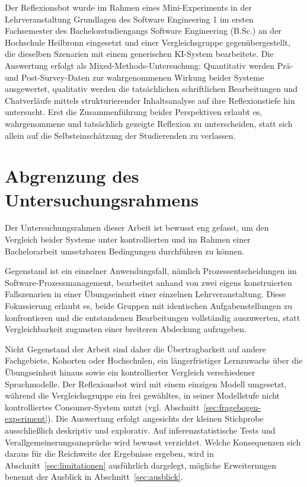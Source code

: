 Der Reflexionsbot wurde im Rahmen eines Mini-Experiments in der Lehrveranstaltung \glqq Grundlagen
des Software Engineering 1\grqq{} im ersten Fachsemester des Bachelorstudiengangs Software
Engineering (B.Sc.) an der Hochschule Heilbronn eingesetzt und einer Vergleichsgruppe
gegenübergestellt, die dieselben Szenarien mit einem generischen KI-System bearbeitete. Die Auswertung erfolgt als
Mixed-Methods-Untersuchung: Quantitativ werden Prä- und Post-Survey-Daten zur wahrgenommenen Wirkung
beider Systeme ausgewertet, qualitativ werden die tatsächlichen schriftlichen Bearbeitungen und
Chatverläufe mittels strukturierender Inhaltsanalyse auf ihre Reflexionstiefe hin untersucht. Erst
die Zusammenführung beider Perspektiven erlaubt es, wahrgenommene und tatsächlich gezeigte Reflexion
zu unterscheiden, statt sich allein auf die Selbsteinschätzung der Studierenden zu verlassen.

\section{Abgrenzung des Untersuchungsrahmens}
\label{sec:abgrenzung}

Der Untersuchungsrahmen dieser Arbeit ist bewusst eng gefasst, um den Vergleich beider Systeme unter
kontrollierten und im Rahmen einer Bachelorarbeit umsetzbaren Bedingungen durchführen zu können.

Gegenstand ist ein einzelner Anwendungsfall, nämlich Prozessentscheidungen im
Software-Prozessmanagement, bearbeitet anhand von zwei eigens konstruierten Fallszenarien in einer
Übungseinheit einer einzelnen Lehrveranstaltung. Diese Fokussierung erlaubt es, beide Gruppen mit identischen Aufgabenstellungen zu
konfrontieren und die entstandenen Bearbeitungen vollständig auszuwerten, statt Vergleichbarkeit
zugunsten einer breiteren Abdeckung aufzugeben.

Nicht Gegenstand der Arbeit sind daher die Übertragbarkeit auf andere Fachgebiete, Kohorten oder
Hochschulen, ein längerfristiger Lernzuwachs über die Übungseinheit hinaus sowie ein kontrollierter
Vergleich verschiedener Sprachmodelle. Der Reflexionsbot wird mit einem einzigen Modell umgesetzt,
während die Vergleichsgruppe ein frei gewähltes, in seiner Modellstufe nicht kontrolliertes
Consumer-System nutzt (vgl. Abschnitt~\ref{sec:fragebogen-experiment}). Die Auswertung erfolgt
angesichts der kleinen Stichprobe ausschließlich deskriptiv und explorativ. Auf inferenzstatistische
Tests und Verallgemeinerungsansprüche wird bewusst verzichtet. Welche Konsequenzen sich daraus für die
Reichweite der Ergebnisse ergeben, wird in Abschnitt~\ref{sec:limitationen} ausführlich dargelegt,
mögliche Erweiterungen benennt der Ausblick in Abschnitt~\ref{sec:ausblick}.

